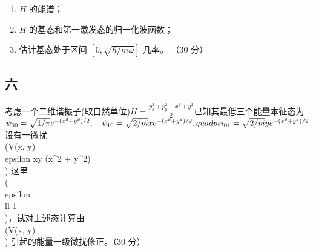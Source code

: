 \begin{enumerate}
    \item $H$ 的能谱；
    \item $H$ 的基态和第一激发态的归一化波函数；
    \item 估计基态处于区间 $[0, \sqrt{\hbar/m\omega}]$ 几率。 （30 分）
\end{enumerate}

\subsection{六}
考虑一个二维谐振子(取自然单位)$H = \frac{p_x^2 + p_y^2 + x^2 + y^2}{2}$已知其最低三个能量本征态为$\psi_{00} = \sqrt{1/\pi} e^{-(x^2 + y^2)/2}, \quad \psi_{10} = \sqrt{2/\\pi} x e^{-(x^2 + y^2)/2}, \\quad \\psi_{01} = \sqrt{2/\\pi} y e^{-(x^2 + y^2)/2}$
设有一微扰 \\(V(x, y) = \\epsilon xy (x^2 + y^2)\\) 这里 \\(\\epsilon \\ll 1\\)，试对上述态计算由 \\(V(x, y)\\) 引起的能量一级微扰修正。（30 分）